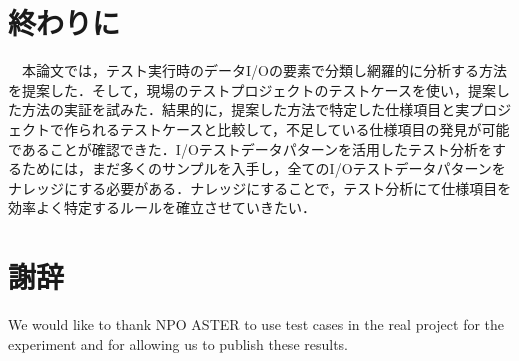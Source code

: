 \section{終わりに}
　本論文では，テスト実行時のデータI/Oの要素で分類し網羅的に分析する方法を提案した．そして，現場のテストプロジェクトのテストケースを使い，提案した方法の実証を試みた．結果的に，提案した方法で特定した仕様項目と実プロジェクトで作られるテストケースと比較して，不足している仕様項目の発見が可能であることが確認できた．I/Oテストデータパターンを活用したテスト分析をするためには，まだ多くのサンプルを入手し，全てのI/Oテストデータパターンをナレッジにする必要がある．ナレッジにすることで，テスト分析にて仕様項目を効率よく特定するルールを確立させていきたい．

  \section{謝辞}
  We would like to thank NPO ASTER to use test cases in the real project for the experiment and for allowing us to publish these results.
